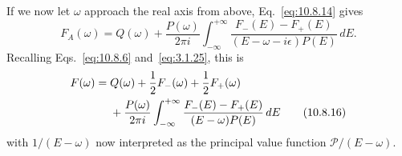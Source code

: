 If we now let $\omega$ approach the real axis from above,
Eq.~\eqref{eq:10.8.14} gives
\begin{equation}
  F_A(\omega)=Q(\omega)+\frac{P(\omega)}{2\pi i}
  \int_{-\infty}^{+\infty}
  \frac{F_-(E)-F_+(E)}{(E-\omega-i\epsilon)P(E)}\,dE.
  \tag{10.8.15}\label{eq:10.8.15}
\end{equation}
Recalling Eqs.~\eqref{eq:10.8.6} and~\eqref{eq:3.1.25}, this is
\begin{align}
  F(\omega)={}&Q(\omega)+\frac12F_-(\omega)+\frac12F_+(\omega)
  \notag\\
  &{}+\frac{P(\omega)}{2\pi i}\int_{-\infty}^{+\infty}
  \frac{F_-(E)-F_+(E)}{(E-\omega)P(E)}\,dE
  \tag{10.8.16}\label{eq:10.8.16}
\end{align}
with $1/(E-\omega)$ now interpreted as the principal value function
$\mathcal P/(E-\omega)$.

